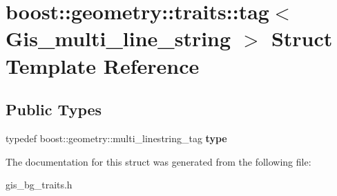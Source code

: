 \hypertarget{structboost_1_1geometry_1_1traits_1_1tag_3_01Gis__multi__line__string_01_4}{}\section{boost\+:\+:geometry\+:\+:traits\+:\+:tag$<$ Gis\+\_\+multi\+\_\+line\+\_\+string $>$ Struct Template Reference}
\label{structboost_1_1geometry_1_1traits_1_1tag_3_01Gis__multi__line__string_01_4}
\subsection*{Public Types}
\begin{DoxyCompactItemize}
\item 
\mbox{\label{structboost_1_1geometry_1_1traits_1_1tag_3_01Gis__multi__line__string_01_4_a615459050a271fa45453e7a3a634b136}} 
typedef boost\+::geometry\+::multi\+\_\+linestring\+\_\+tag {\bfseries type}
\end{DoxyCompactItemize}


The documentation for this struct was generated from the following file\+:\begin{DoxyCompactItemize}
\item 
gis\+\_\+bg\+\_\+traits.\+h\end{DoxyCompactItemize}
